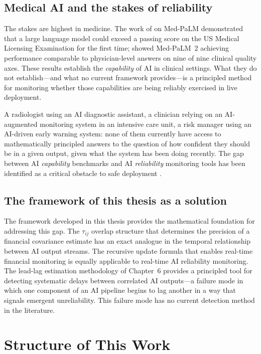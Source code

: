 \documentclass[reqno, 12pt]{amsart}
\newcommand{\tauij}{\tau_{ij}}
\theoremstyle{plain}
\theoremstyle{definition}
\theoremstyle{remark}
\begin{document}
\subsection{Medical AI and the stakes of reliability}

The stakes are highest in medicine. The work of \citet{singhal2023}
on Med-PaLM demonstrated that a large language model could exceed a
passing score on the US Medical Licensing Examination for the first
time; \citet{singhal2025} showed Med-PaLM~2 achieving performance
comparable to physician-level answers on nine of nine clinical quality
axes. These results establish the \emph{capability} of AI in clinical
settings. What they do not establish---and what no current framework
provides---is a principled method for monitoring whether those
capabilities are being reliably exercised in live deployment.

A radiologist using an AI diagnostic assistant, a clinician relying
on an AI-augmented monitoring system in an intensive care unit, a
risk manager using an AI-driven early warning system: none of them
currently have access to mathematically principled answers to the
question of how confident they should be in a given output, given what
the system has been doing recently. The gap between AI
\emph{capability} benchmarks and AI \emph{reliability} monitoring
tools has been identified as a critical obstacle to safe deployment
\citep{lindenmeyer2025}.

\subsection{The framework of this thesis as a solution}

The framework developed in this thesis provides the mathematical
foundation for addressing this gap. The $\tauij$ overlap structure
that determines the precision of a financial covariance estimate has
an exact analogue in the temporal relationship between AI output
streams. The recursive update formula that enables real-time financial
monitoring is equally applicable to real-time AI reliability
monitoring. The lead-lag estimation methodology of Chapter~6 provides
a principled tool for detecting systematic delays between correlated
AI outputs---a failure mode in which one component of an AI pipeline
begins to lag another in a way that signals emergent unreliability.
This failure mode has no current detection method in the literature.

\section{Structure of This Work}
\label{sec:structure}
\end{document}
